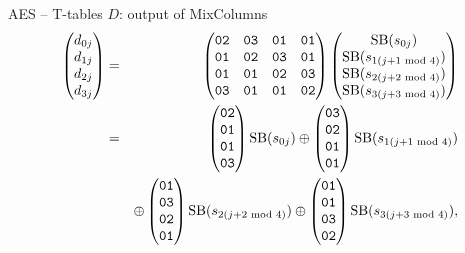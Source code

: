 \begin{frame}{AES -- T-tables}
$D$: output of MixColumns
    \begin{eqnarray*}
    \begin{pmatrix}
    d_{0j}\\
    d_{1j}\\
    d_{2j}\\
    d_{3j}
    \end{pmatrix}
    &=&
    \begin{pmatrix}
    \texttt{02} & \texttt{03} & \texttt{01} & \texttt{01} \\
    \texttt{01} & \texttt{02} & \texttt{03} & \texttt{01} \\
    \texttt{01} & \texttt{01} & \texttt{02} & \texttt{03} \\
    \texttt{03} & \texttt{01} & \texttt{01} & \texttt{02}
    \end{pmatrix}
    \begin{pmatrix}
    \text{SB}(s_{0j})\\
    \text{SB}(s_{1(j+1\textrm{~mod~} 4)})\\
    \text{SB}(s_{2(j+2\textrm{~mod~} 4)})\\
    \text{SB}(s_{3(j+3\textrm{~mod~} 4)})
    \end{pmatrix}\\
    &=&
    \begin{pmatrix}
    \texttt{02}\\
    \texttt{01}\\
    \texttt{01}\\
    \texttt{03}
    \end{pmatrix}\text{SB}(s_{0j})
    \oplus
    \begin{pmatrix}
    \texttt{03}\\
    \texttt{02}\\
    \texttt{01}\\
    \texttt{01}
    \end{pmatrix}\text{SB}(s_{1(j+1\textrm{~mod~} 4)})\\
    &&\oplus
    \begin{pmatrix}
    \texttt{01}\\
    \texttt{03}\\
    \texttt{02}\\
    \texttt{01}
    \end{pmatrix}\text{SB}(s_{2(j+2\textrm{~mod~} 4)})
    \oplus
    \begin{pmatrix}
    \texttt{01}\\
    \texttt{01}\\
    \texttt{03}\\
    \texttt{02}
    \end{pmatrix}\text{SB}(s_{3(j+3\textrm{~mod~} 4)}),
    \end{eqnarray*}
\end{frame}

